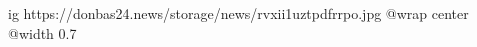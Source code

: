  
 
 
 
 

\ifcmt
  ig https://donbas24.news/storage/news/rvxii1uztpdfrrpo.jpg
  @wrap center
  @width 0.7
\fi
